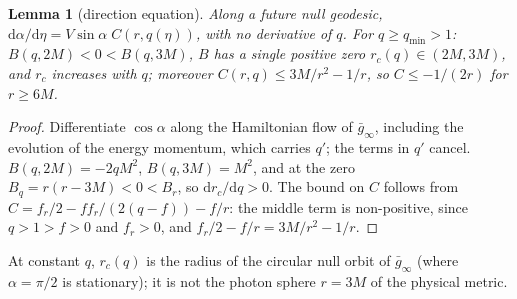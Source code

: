\documentclass[aip,jmp,amsmath,amssymb,reprint]{revtex4-2}
\newcommand{\dd}{\mathrm{d}}
\theoremstyle{plain}
\newtheorem{lemma}[proposition]{Lemma}
\theoremstyle{definition}
\begin{document}
\begin{lemma}[direction equation]\label{lem:tk-direction}
Along a future null geodesic, $\dd\alpha/\dd\eta=V\sin\alpha\;C(r,q(\eta))$, with no derivative of $q$.
For $q\ge q_{\min}>1$: $B(q,2M)<0<B(q,3M)$, $B$ has a single positive zero $r_c(q)\in(2M,3M)$, and
$r_c$ increases with $q$; moreover $C(r,q)\le3M/r^2-1/r$, so $C\le-1/(2r)$ for $r\ge6M$.
\end{lemma}

\begin{proof}
Differentiate $\cos\alpha$ along the Hamiltonian flow of $\bar g_\infty$, including the evolution
of the energy momentum, which carries $q'$; the terms in $q'$ cancel. $B(q,2M)=-2qM^2$,
$B(q,3M)=M^2$, and at the zero $B_q=r(r-3M)<0<B_r$, so $\dd r_c/\dd q>0$. The bound on $C$ follows
from $C=f_r/2-ff_r/(2(q-f))-f/r$: the middle term is non-positive, since $q>1>f>0$ and $f_r>0$, and
$f_r/2-f/r=3M/r^2-1/r$.
\end{proof}

At constant $q$, $r_c(q)$ is the radius of the circular null orbit of $\bar g_\infty$ (where
$\alpha=\pi/2$ is stationary); it is not the photon sphere $r=3M$ of the physical metric.
\end{document}
